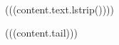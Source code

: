 \noindent \,\, \par
\vspace{-13pt}
\begin{itemize}(((content.text.lstrip())))\end{itemize} (((content.tail)))
